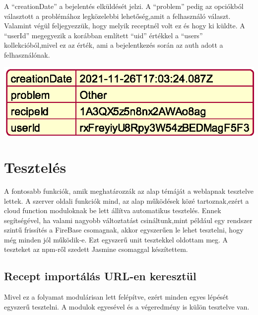 \documentclass[12pt]{report}
\theoremstyle{definition}
\begin{document}
A “creationDate” a bejelentés elküldését jelzi. A “problem” pedig az opciókból választott a problémához legközelebbi lehetőség,amit a felhasználó választ. Valamint végül feljegyezzük, hogy melyik receptnél volt ez és hogy ki küldte. A “userId” megegyezik a korábban említett “uid” értékkel a “users” kollekcióból,mivel ez az érték, ami a bejelentkezés során az auth adott a felhasználónak.

\noindent
\includegraphics[scale=0.6]{out/diagrams/jsonReports/jsonReports.eps}




\chapter{Tesztelés}
A fontosabb funkciók, amik meghatározzák az alap témáját a weblapnak tesztelve lettek. A szerver oldali funkciók mind, az alap működések közé tartoznak,ezért a cloud function moduloknak be lett állítva automatikus tesztelés. Ennek segítségével, ha valami nagyobb változtatást csináltunk,mint például egy rendszer szintű frissítés a FireBase csomagnak, akkor egyszerűen le lehet tesztelni, hogy még minden jól működik-e. Ezt egyszerű unit tesztekkel oldottam meg. A teszteket az npm-ről szedett Jasmine csomaggal készítettem.

\section{Recept importálás URL-en keresztül}
Mivel ez a folyamat modulárisan lett felépítve, ezért minden egyes lépését egyszerű tesztelni. A modulok egyesével és a végeredmény is külön tesztelve van.
\end{document}
